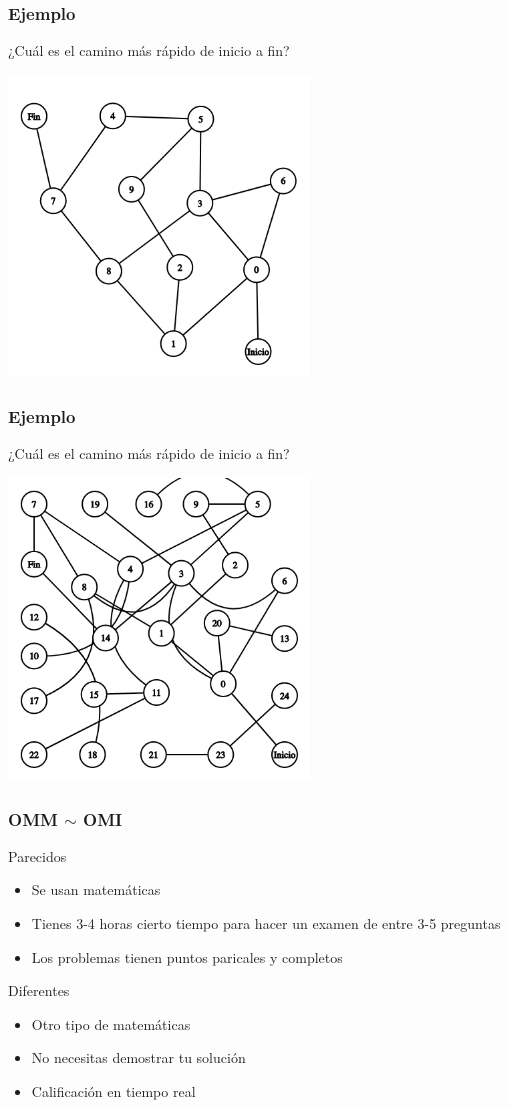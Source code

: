 \documentclass{beamer}
\begin{document}
\begin{frame}
  \frametitle{Ejemplo}
	¿Cuál es el camino más rápido de inicio a fin?
	\begin{center}
		\includegraphics[width=0.6\textwidth]{img/medio.png}
	\end{center}
\end{frame}

\begin{frame}
  \frametitle{Ejemplo}
	¿Cuál es el camino más rápido de inicio a fin?
	\begin{center}
		\includegraphics[width=0.6\textwidth]{img/dificil.png}
	\end{center}
\end{frame}

\begin{frame}
  \frametitle{OMM $\sim$ OMI}
	Parecidos
	\begin{itemize}
		\item Se usan matemáticas
		\item Tienes 3-4 horas cierto tiempo para hacer un examen de entre 3-5 preguntas
		\item Los problemas tienen puntos paricales y completos
	\end{itemize}
	Diferentes
	\begin{itemize}
		\item Otro tipo de matemáticas
		\item No necesitas demostrar tu solución
		\item Calificación en tiempo real
	\end{itemize}
\end{frame}
\end{document}

